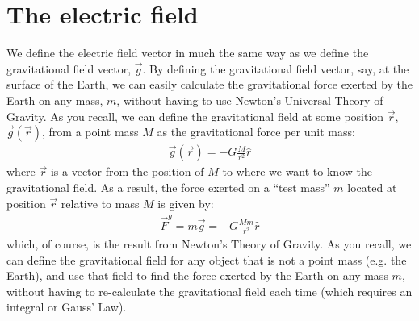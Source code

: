 \section{The electric field}
We define the electric field vector in much the same way as we define the gravitational field vector, $\vec g$. By defining the gravitational field vector, say, at the surface of the Earth, we can easily calculate the gravitational force exerted by the Earth on any mass, $m$, without having to use Newton's Universal Theory of Gravity. As you recall, we can define the gravitational field at some position $\vec r$, $\vec g(\vec r)$, from a point mass $M$ as the gravitational force per unit mass:
\begin{align*}
\vec g(\vec r) = -G \frac{M}{r^2}\hat r
\end{align*}
where $\vec r$ is a vector from the position of $M$ to where we want to know the gravitational field. As a result, the force exerted on a ``test mass'' $m$ located at position $\vec r$ relative to mass $M$ is given by:
\begin{align*}
\vec F^g=m\vec g= -G\frac{Mm}{r^2}\hat r
\end{align*}
which, of course, is the result from Newton's Theory of Gravity. As you recall, we can define the gravitational field for  any object that is not a point mass (e.g. the Earth), and use that field to find the force exerted by the Earth on any mass $m$, without having to re-calculate the gravitational field each time (which requires an integral or Gauss' Law). 

